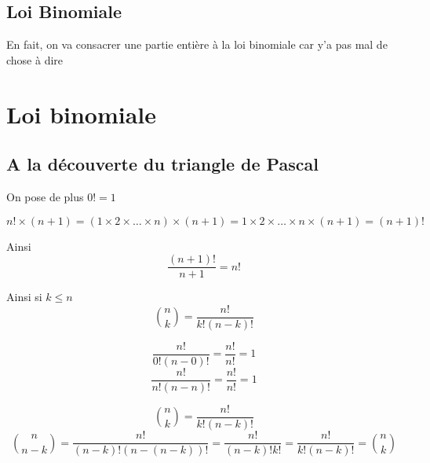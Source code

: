 \subsection{Loi Binomiale}
En fait, on va consacrer une partie entière à la loi binomiale car y'a pas mal de chose à dire
\section{Loi binomiale}
\subsection{A la découverte du triangle de Pascal}
\newline

On pose de plus $0! = 1$\newline


\newline

\begin{preuve}
$$n!\times (n+1) = (1 \times 2 \times \ldots \times n) \times (n+1) = 1 \times 2 \times \ldots \times n \times (n+1) = (n+1)!$$
\end{preuve}
Ainsi 
$$\dfrac{(n+1)!}{n+1} = n!$$
\newline

Ainsi si $k \leq n$
$$\binom{n}{k} = \dfrac{n!}{k!(n-k)!}$$
\newline

\begin{preuve}
$$\dfrac{n!}{0!(n-0)!} = \dfrac{n!}{n!} = 1$$
$$\dfrac{n!}{n!(n-n)!} = \dfrac{n!}{n!} = 1$$
\end{preuve}
\newline

\begin{preuve}
$$\binom{n}{k} = \dfrac{n!}{k!(n-k)!}$$
$$\binom{n}{n-k} = \dfrac{n!}{(n-k)! (n-(n-k))!} = \dfrac{n!}{(n-k)!k!} = \dfrac{n!}{k!(n-k)!} = \binom{n}{k}$$
\end{preuve}

